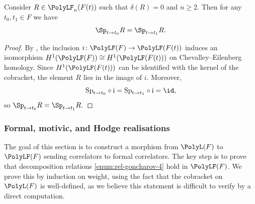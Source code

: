 \documentclass[a4paper]{amsart}
\begin{document}
\begin{lemma}\label{lem:specialisation in formal polylogs} Consider $R\in \PolyLF_n(F(t))$ such that $\delta(R)=0$ and $n\geq 2$. Then for any $t_0, t_1\in F$ we have
\[
\Sp_{t\to t_0}R=\Sp_{t\to t_1}R.
\] 
\end{lemma}
\begin{proof}
By \cite[Corollary 11]{CMRR24}, the inclusion  $i\colon \PolyLF(F)\to \PolyLF(F(t))$ induces an isomorphism $H^1(\PolyLF(F))\cong H^1(\PolyLF(F(t)))$ on Chevalley--Eilenberg homology. Since $H^1(\PolyLF(F(t)))$ can be identified with the kernel of the cobracket, the element $R$ lies in the image of $i$. Moreover, 
\[
\rm{Sp}_{t\to t_0}\circ i=\rm{Sp}_{t\to t_1}\circ i=\id,
\]
so $\Sp_{t\to t_0}R=\Sp_{t\to t_1}R.$
\end{proof}




\subsubsection{Formal, motivic, and Hodge realisations}
The goal of this section is to construct a morphism from $\PolyL(F)$ to $\PolyLF(F)$ sending correlators to formal correlators. The key step is to prove that decomposition relations \eqref{enum:rel-goncharov-4} hold in $\PolyLF(F)$. We prove this by induction on weight, using the fact that the cobracket on $\PolyL(F)$ is well-defined, as we believe this statement is difficult to verify by a direct computation.
\end{document}
